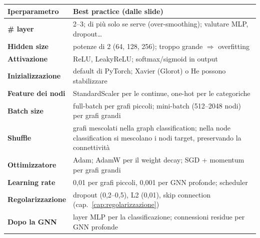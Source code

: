 \begin{center}
\small
\renewcommand{\arraystretch}{1.15}
\begin{tabularx}{\textwidth}{>{\bfseries}l X}
\toprule
Iperparametro & Best practice (dalle slide)\\
\midrule
\# layer & 2--3; di più solo se serve (over-smoothing); valutare MLP, dropout\ldots\\
Hidden size & potenze di 2 (64, 128, 256); troppo grande $\Rightarrow$ overfitting\\
Attivazione & ReLU, LeakyReLU; softmax/sigmoid in output\\
Inizializzazione & default di PyTorch; Xavier (Glorot) o He possono stabilizzare\\
Feature dei nodi & StandardScaler per le continue, one-hot per le categoriche\\
Batch size & full-batch per grafi piccoli; mini-batch (512--2048 nodi) per grafi grandi\\
Shuffle & grafi mescolati nella graph classification; nella node classification si mescolano i nodi target, preservando la connettività\\
Ottimizzatore & Adam; AdamW per il weight decay; SGD + momentum per grafi grandi\\
Learning rate & 0,01 per grafi piccoli, 0,001 per GNN profonde; scheduler\\
Regolarizzazione & dropout (0,2--0,5), L2 (0,01), skip connection (cap.~\ref{cap:regolarizzazione})\\
Dopo la GNN & layer MLP per la classificazione; connessioni residue per GNN profonde\\
\bottomrule
\end{tabularx}
\end{center}


